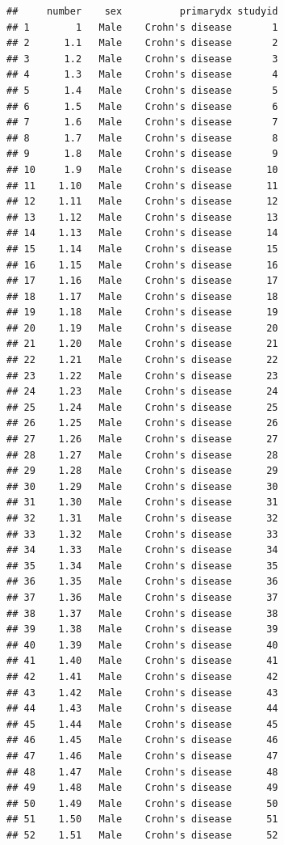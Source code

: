\documentclass[
]{book}
\begin{document}
\begin{verbatim}
##     number    sex          primarydx studyid
## 1        1   Male    Crohn's disease       1
## 2      1.1   Male    Crohn's disease       2
## 3      1.2   Male    Crohn's disease       3
## 4      1.3   Male    Crohn's disease       4
## 5      1.4   Male    Crohn's disease       5
## 6      1.5   Male    Crohn's disease       6
## 7      1.6   Male    Crohn's disease       7
## 8      1.7   Male    Crohn's disease       8
## 9      1.8   Male    Crohn's disease       9
## 10     1.9   Male    Crohn's disease      10
## 11    1.10   Male    Crohn's disease      11
## 12    1.11   Male    Crohn's disease      12
## 13    1.12   Male    Crohn's disease      13
## 14    1.13   Male    Crohn's disease      14
## 15    1.14   Male    Crohn's disease      15
## 16    1.15   Male    Crohn's disease      16
## 17    1.16   Male    Crohn's disease      17
## 18    1.17   Male    Crohn's disease      18
## 19    1.18   Male    Crohn's disease      19
## 20    1.19   Male    Crohn's disease      20
## 21    1.20   Male    Crohn's disease      21
## 22    1.21   Male    Crohn's disease      22
## 23    1.22   Male    Crohn's disease      23
## 24    1.23   Male    Crohn's disease      24
## 25    1.24   Male    Crohn's disease      25
## 26    1.25   Male    Crohn's disease      26
## 27    1.26   Male    Crohn's disease      27
## 28    1.27   Male    Crohn's disease      28
## 29    1.28   Male    Crohn's disease      29
## 30    1.29   Male    Crohn's disease      30
## 31    1.30   Male    Crohn's disease      31
## 32    1.31   Male    Crohn's disease      32
## 33    1.32   Male    Crohn's disease      33
## 34    1.33   Male    Crohn's disease      34
## 35    1.34   Male    Crohn's disease      35
## 36    1.35   Male    Crohn's disease      36
## 37    1.36   Male    Crohn's disease      37
## 38    1.37   Male    Crohn's disease      38
## 39    1.38   Male    Crohn's disease      39
## 40    1.39   Male    Crohn's disease      40
## 41    1.40   Male    Crohn's disease      41
## 42    1.41   Male    Crohn's disease      42
## 43    1.42   Male    Crohn's disease      43
## 44    1.43   Male    Crohn's disease      44
## 45    1.44   Male    Crohn's disease      45
## 46    1.45   Male    Crohn's disease      46
## 47    1.46   Male    Crohn's disease      47
## 48    1.47   Male    Crohn's disease      48
## 49    1.48   Male    Crohn's disease      49
## 50    1.49   Male    Crohn's disease      50
## 51    1.50   Male    Crohn's disease      51
## 52    1.51   Male    Crohn's disease      52

\end{verbatim}
\end{document}
